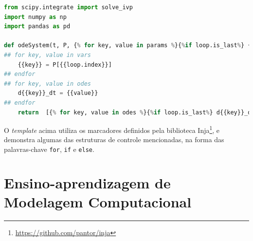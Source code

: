 \documentclass[
	12pt,				%
	openright,			%
	oneside,			%
	a4paper,			%
	main=brazil,
	english,			%
	]{ufsj-abntex2}
\begin{document}
\begin{lstlisting}[language=Python, firstnumber=1]
from scipy.integrate import solve_ivp
import numpy as np
import pandas as pd

def odeSystem(t, P, {% for key, value in params %}{%if loop.is_last%} {{key}} {%else%} {{key}}, {%endif%}{%endfor%}):
## for key, value in vars
    {{key}} = P[{{loop.index}}]
## endfor
## for key, value in odes
    d{{key}}_dt = {{value}}
## endfor     
    return  [{% for key, value in odes %}{%if loop.is_last%} d{{key}}_dt {%else%} d{{key}}_dt, {%endif%}{%endfor%}]
\end{lstlisting}

O \textit{template} acima utiliza os marcadores definidos pela biblioteca Inja\footnote{\href{https://github.com/pantor/inja}{https://github.com/pantor/inja}}, e demonstra algumas das estruturas de controle mencionadas, na forma das palavras-chave \texttt{\textcolor{codepurple}{for}}, \texttt{\textcolor{codepurple}{if}} e \texttt{\textcolor{codepurple}{else}}.






\section{Ensino-aprendizagem de Modelagem Computacional}\label{sec:ensino-aprendizagem} 
\end{document}

